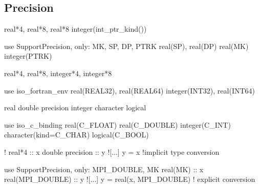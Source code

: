 \documentclass{article}
\begin{document}
\subsection{Precision}
\label{sec:precision}

\begin{codea}

real*4, real*8, 
real*8
integer(int_ptr_kind())
\end{codea}
\begin{codeb}
use SupportPrecision, only: MK, SP, DP, PTRK
real(SP), real(DP)
real(MK)
integer(PTRK)

\end{codeb}
\begin{codea}

real*4, real*8, 
integer*4, integer*8
\end{codea} 
\begin{codeb}
use iso_fortran_env
real(REAL32), real(REAL64)
integer(INT32), real(INT64)
\end{codeb}
\begin{codea}

real
double precision
integer
character
logical
\end{codea}
\begin{codeb}
use iso_c_binding
real(C_FLOAT)
real(C_DOUBLE)
integer(C_INT)
character(kind=C_CHAR)
logical(C_BOOL)
\end{codeb}
\begin{codea}
!
real*4           :: x
double precision :: y
![...]
y = x  !implicit type conversion
\end{codea} 
\begin{codeb}
use SupportPrecision, only: MPI_DOUBLE, MK
real(MK)         :: x
real(MPI_DOUBLE) :: y
![...]
y = real(x, MPI_DOUBLE) ! explicit conversion 
\end{codeb}
% 
\end{document}

